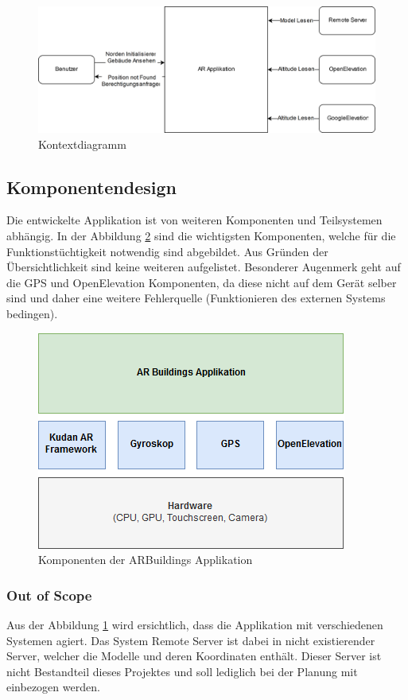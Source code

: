 \documentclass[a4paper]{scrreprt}
\begin{document}
\begin{figure}[h!]
	\includegraphics[keepaspectratio, width=\textwidth]{KontextDiagram.png}
	\caption{Kontextdiagramm}
	\label{fig:Kontext}
\end{figure}

\clearpage

\subsection{Komponentendesign}

Die entwickelte Applikation ist von weiteren Komponenten und Teilsystemen abhängig. In der Abbildung \ref{fig:Komponentendesign} sind die wichtigsten Komponenten, welche für die Funktionstüchtigkeit notwendig sind abgebildet. Aus Gründen der Übersichtlichkeit sind keine weiteren aufgelistet.
\bigbreak
Besonderer Augenmerk geht auf die GPS und OpenElevation Komponenten, da diese nicht auf dem Gerät selber sind und daher eine weitere Fehlerquelle (Funktionieren des externen Systems bedingen).

\begin{figure}[h!]
	\centering
	\includegraphics[width=0.7\linewidth, keepaspectratio]{Komponentendesign}
	\caption{Komponenten der ARBuildings Applikation}
	\label{fig:Komponentendesign}
\end{figure}

\subsubsection{Out of Scope}
Aus der Abbildung \ref{fig:Kontext} wird ersichtlich, dass die Applikation mit verschiedenen Systemen agiert. Das System Remote Server ist dabei in nicht existierender Server, welcher die Modelle und deren Koordinaten enthält. Dieser Server ist nicht Bestandteil dieses Projektes und soll lediglich bei der Planung mit einbezogen werden.
\end{document}
